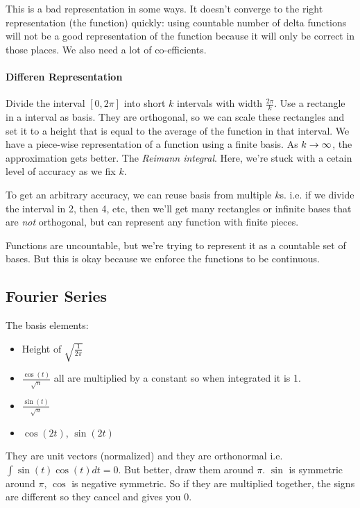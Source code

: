 This is a bad representation in some ways. It doesn't converge to the
right representation (the function) quickly:  using countable number of delta functions will not be a good
representation of the function because it will only be correct in
those places. We also need a lot of co-efficients. 

\paragraph{Differen Representation}
\label{sec:diff-repr}
Divide the interval $[0, 2\pi]$ into short $k$ intervals with width
$\frac{2\pi}{k}$. Use a rectangle in a interval as basis. They are
orthogonal, so we can scale these rectangles and set it to a height
that is equal to the average of the function in that interval. We have
a piece-wise representation of a function using a finite basis. As $k\rightarrow \infty$, the approximation gets better. The
\emph{Reimann integral}. Here, we're stuck with a cetain level of
accuracy as we fix $k$.

To get an arbitrary accuracy, we can reuse basis from multiple
$k$s. i.e. if we divide the interval in 2, then 4, etc, then we'll get many
rectangles or infinite bases that are \emph{not} orthogonal, but can
represent any function with finite pieces.

Functions are uncountable, but we're trying to represent it as a
countable set of bases. But this is okay because we enforce the
functions to be continuous. 

\subsection{Fourier Series}
\label{sec:fourier-basis}
The basis elements:
\begin{itemize}
\item Height of $\sqrt{\frac{1}{2\pi}}$
\item $\frac{\cos(t)}{\sqrt{n}}$ all are multiplied by a constant so when
  integrated it is 1.
\item $\frac{\sin(t)}{\sqrt{n}}$
\item $\cos(2t)$, $\sin(2t)$
\end{itemize}

They are unit vectors (normalized) and they are orthonormal
i.e. $\int \sin(t)\cos(t)dt =0$. But better, draw them around
$\pi$. $\sin$ is symmetric around $\pi$, $\cos$ is negative
symmetric. So if they are multiplied together, the signs are different
so they cancel and gives you 0. 

